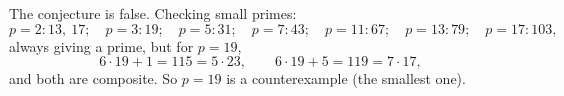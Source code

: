 The conjecture is false. Checking small primes:
\[p=2:13,\ 17;\quad p=3:19;\quad p=5:31;\quad p=7:43;\quad p=11:67;\quad p=13:79;\quad p=17:103,\]
always giving a prime, but for $p=19$,
\[6\cdot19+1=115=5\cdot23,\qquad 6\cdot19+5=119=7\cdot17,\]
and both are composite. So $\boxed{p=19}$ is a counterexample (the smallest one).
